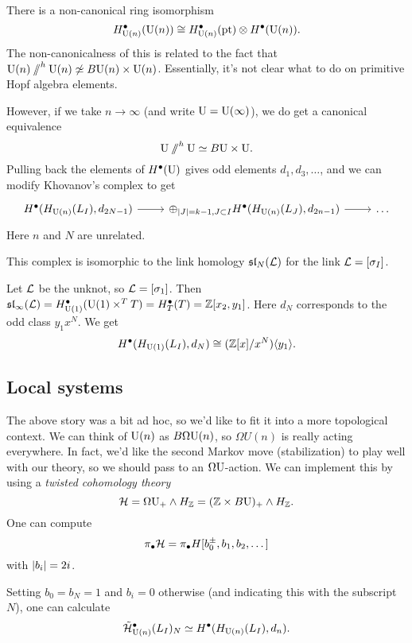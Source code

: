 There is a non-canonical ring isomorphism 
\[
	H^\bullet_{\mathrm{U}(n)}(\mathrm{U}(n)) \cong H^\bullet_{\mathrm{U}(n)}(\operatorname{pt}) \otimes H^\bullet(\mathrm{U}(n)).
\]
The non-canonicalness of this is related to the fact that $\mathrm{U}(n) \mathbin{/\mkern-6mu/}^h \mathrm{U}(n) \not\simeq B\mathrm{U}(n) \times \mathrm{U}(n)$.
Essentially, it's not clear what to do on primitive Hopf algebra elements.

However, if we take $n \to \infty$ (and write $\mathrm{U} = \mathrm{U}(\infty)$), we do get a canonical equivalence
\[
	\mathrm{U} \mathbin{/\mkern-6mu/}^h \mathrm{U} \simeq B\mathrm{U} \times \mathrm{U}.
\]
Pulling back the elements of $H^\bullet(\mathrm{U})$ gives odd elements $d_1, d_3, \dots$, and we can modify Khovanov's complex to get
\[
	\begin{tikzcd}
		H^\bullet(H_{\U(n)}(L_I), d_{2N-1}) \rar & \oplus_{\abs{J} = k-1, J \subset I}H^\bullet(H_{\U(n)}(L_J), d_{2n-1}) \rar & \dots 
	\end{tikzcd}
\]
Here $n$ and $N$ are unrelated.

\begin{thm}[T. Gomez]
	This complex is isomorphic to the link homology $\mathfrak{sl}_N(\mathcal{L})$ for the link $\mathcal{L} = [\sigma_I]$.
\end{thm}

\begin{ex}
	Let $\mathcal{L}$ be the unknot, so $\mathcal{L} = [\sigma_1]$.
	Then $\mathfrak{sl}_\infty(\mathcal{L}) = H^\bullet_{\mathrm{U}(1)}(\mathrm{U}(1) \times^T T) = H^\bullet_T(T) = \mathbb{Z}[x_2, y_1]$.
	Here $d_N$ corresponds to the odd class $y_1 x^N$.
	We get
	\[
		H^\bullet(H_{\mathrm{U}(1)}(L_I), d_N) \cong (\mathbb{Z}[x] / x^N) \langle y_1 \rangle.
	\]
\end{ex}

\subsection{Local systems}

The above story was a bit ad hoc, so we'd like to fit it into a more topological context.
We can think of $\mathrm{U}(n)$ as $B \Omega \mathrm{U}(n)$, so $\Omega U(n)$ is really acting everywhere.
In fact, we'd like the second Markov move (stabilization) to play well with our theory, so we should pass to an $\Omega \mathrm{U}$-action.
We can implement this by using a \emph{twisted cohomology theory}
\[
	\mathcal{H} = \Omega \mathrm{U}_+ \wedge H_{\mathbb{Z}} = (\mathbb{Z} \times B\mathrm{U})_+ \wedge H_{\mathbb{Z}}.
\]
One can compute
\[
	\pi_\bullet \mathcal{H} = \pi_\bullet H[b_0^\pm, b_1, b_2, \dots]
\]
with $\left|{b_i}\right| = 2i$.

Setting $b_0 = b_N = 1$ and $b_i = 0$ otherwise (and indicating this with the subscript $N$), one can calculate
\[
	\tilde{\mathcal{H}}_{\mathrm{U}(n)}^\bullet(L_I)_N \simeq H^\bullet(H_{\mathrm{U}(n)}(L_I), d_n).
\]
